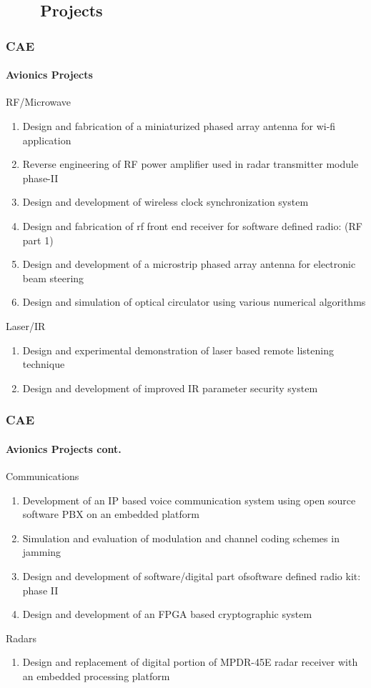 \subsection{\ \ \ \ Projects}
\begin{frame}
\frametitle{CAE}
\framesubtitle{Avionics Projects}
\mypagenum{}
RF/Microwave
\begin{enumerate}\scriptsize
\item Design and fabrication of a miniaturized phased array antenna for wi-fi application
\item Reverse engineering of RF power amplifier used in radar transmitter module phase-II
\item Design and development of wireless clock synchronization system
\item Design and fabrication of rf front end receiver for software defined radio: (RF part 1)
\item Design and development of a microstrip phased array antenna for electronic beam steering
\item Design and simulation of optical circulator using various numerical algorithms
\end{enumerate}
Laser/IR
\begin{enumerate}\scriptsize
\item Design and experimental demonstration of laser based remote listening technique
\item Design and development of improved IR parameter security system
\end{enumerate}
\end{frame}



\begin{frame}
\frametitle{CAE}
\framesubtitle{Avionics Projects \tiny cont.}
\mypagenum{}
Communications
\begin{enumerate}\scriptsize
\item Development of an IP based voice communication system using open source software PBX on an embedded platform
\item Simulation and evaluation of modulation and channel coding schemes in jamming
\item Design and development of software/digital part ofsoftware defined radio kit: phase II
\item Design and development of an FPGA based cryptographic system
\end{enumerate}
Radars
\begin{enumerate}\scriptsize
\item Design and replacement of digital portion of MPDR-45E radar receiver with an embedded processing platform
\end{enumerate}
\end{frame}



